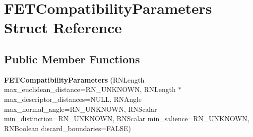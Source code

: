\hypertarget{struct_f_e_t_compatibility_parameters}{}\section{F\+E\+T\+Compatibility\+Parameters Struct Reference}
\label{struct_f_e_t_compatibility_parameters}
\subsection*{Public Member Functions}
\begin{DoxyCompactItemize}
\item 
{\bfseries F\+E\+T\+Compatibility\+Parameters} (R\+N\+Length max\+\_\+euclidean\+\_\+distance=R\+N\+\_\+\+U\+N\+K\+N\+O\+WN, R\+N\+Length $\ast$max\+\_\+descriptor\+\_\+distances=N\+U\+LL, R\+N\+Angle max\+\_\+normal\+\_\+angle=R\+N\+\_\+\+U\+N\+K\+N\+O\+WN, R\+N\+Scalar min\+\_\+distinction=R\+N\+\_\+\+U\+N\+K\+N\+O\+WN, R\+N\+Scalar min\+\_\+salience=R\+N\+\_\+\+U\+N\+K\+N\+O\+WN, R\+N\+Boolean discard\+\_\+boundaries=F\+A\+L\+SE)\hypertarget{struct_f_e_t_compatibility_parameters_af8950f0ac00995b3ef7d47f7f853bb48}{}\label{struct_f_e_t_compatibility_parameters_af8950f0ac00995b3ef7d47f7f853bb48}

\end{DoxyCompactItemize}
